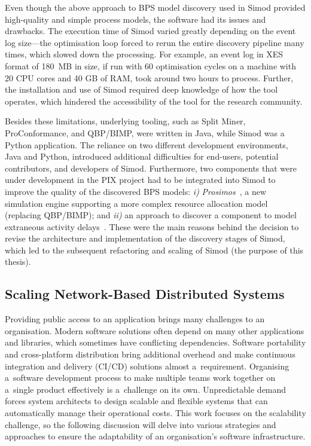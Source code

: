 \documentclass[12pt]{article}
\begin{document}
Even though the above approach to BPS model discovery used in Simod provided high-quality and simple process models, the software had its issues and drawbacks. The execution time of Simod varied greatly depending on the event log size---the optimisation loop forced to rerun the entire discovery pipeline many times, which slowed down the processing. For example, an event log in XES format of 180~MB in size, if run with 60 optimisation cycles on a machine with 20 CPU cores and 40 GB of RAM, took around two hours to process. Further, the installation and use of Simod required deep knowledge of how the tool operates, which hindered the accessibility of the tool for the research community.

Besides these limitations, underlying tooling, such as Split Miner, ProConformance, and QBP/BIMP, were written in Java, while Simod was a Python application. The reliance on two different development environments, Java and Python, introduced additional difficulties for end-users, potential contributors, and developers of Simod. Furthermore, two components that were under development in the PIX project had to be integrated into Simod to improve the quality of the discovered BPS models: \textit{i)} \emph{Prosimos}~\cite{lopez-pintado_prosimos_2023}, a new simulation engine supporting a more complex resource allocation model (replacing QBP/BIMP); and \textit{ii)} an approach to discover a component to model extraneous activity delays~\cite{DBLP:conf/icpm/Chapela-CampaD22}. These were the main reasons behind the decision to revise the architecture and implementation of the discovery stages of Simod, which led to the subsequent refactoring and scaling of Simod (the purpose of this thesis).

\subsection{Scaling Network-Based Distributed Systems\label{ch:background_scaling}}

Providing public access to an application brings many challenges to an organisation. Modern software solutions often depend on many other applications and libraries, which sometimes have conflicting dependencies. Software portability and cross-platform distribution bring additional overhead and make continuous integration and delivery (CI/CD) solutions almost a~requirement. Organising a~software development process to make multiple teams work together on a~single product effectively is a~challenge on its own. Unpredictable demand forces system architects to design scalable and flexible systems that can automatically manage their operational costs. This work focuses on the scalability challenge, so the following discussion will delve into various strategies and approaches to ensure the adaptability of an organisation's software infrastructure.
\end{document}
